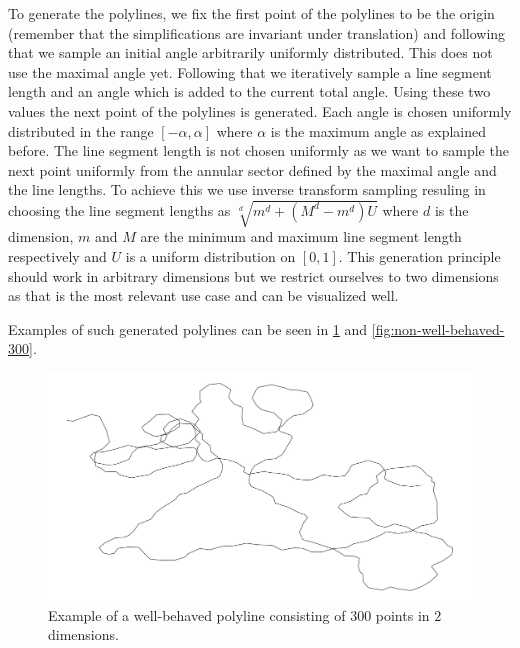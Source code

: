 To generate the polylines, we fix the first point of the polylines to be the origin (remember that the simplifications are invariant under translation) and following that we sample an initial angle arbitrarily uniformly distributed. This does not use the maximal angle yet. Following that we iteratively sample a line segment length and an angle which is added to the current total angle. Using these two values the next point of the polylines is generated. Each angle is chosen uniformly distributed in the range \([-\alpha, \alpha]\) where \(\alpha\) is the maximum angle as explained before. The line segment length is not chosen uniformly as we want to sample the next point uniformly from the annular sector defined by the maximal angle and the line lengths. To achieve this we use inverse transform sampling resuling in choosing the line segment lengths as \(\sqrt[d]{m^d + (M^d-m^d)U}\) where \(d\) is the dimension, \(m\) and \(M\) are the minimum and maximum line segment length respectively and \(U\) is a uniform distribution on \([0,1]\). This generation principle should work in arbitrary dimensions but we restrict ourselves to two dimensions as that is the most relevant use case and can be visualized well.

Examples of such generated polylines can be seen in \cref{fig:well-behaved-300} and \cref{fig:non-well-behaved-300}.

\begin{figure}[b]
  \centering
  \includegraphics[scale=0.3]{./figures/well-behaved-300.png}
  \caption{Example of a well-behaved polyline consisting of \(300\) points in \(2\) dimensions.}
  \label{fig:well-behaved-300}
\end{figure}

